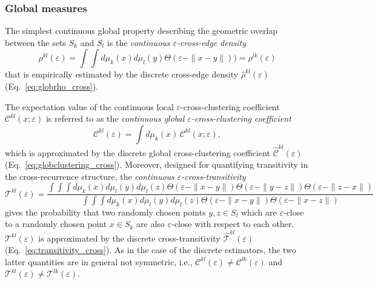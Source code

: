 \documentclass[graybox]{svmult}
\begin{document}
\subsubsection{Global measures}

The simplest continuous global property describing the geometric overlap between the sets $S_k$ and $S_l$ is the \textit{continuous $\varepsilon$-cross-edge density}
\begin{equation}
\rho^{kl}(\varepsilon) = \int\!\!\!\int d\mu_k(x) d\mu_l(y) \Theta(\varepsilon - \|x - y\|)) = \rho^{lk}(\varepsilon)
\end{equation}
that is empirically estimated by the discrete cross-edge density $\hat{\rho}^{kl}(\varepsilon)$ (Eq.~\ref{eq:globrho_cross}).

The expectation value of the continuous local $\varepsilon$-cross-clustering coefficient $\mathcal{C}^{kl}(x;\varepsilon)$ is referred to as the \textit{continuous global $\varepsilon$-cross-clustering coefficient}
\begin{equation}
\mathcal{C}^{kl}(\varepsilon) = \int d\mu_k(x)\, \mathcal{C}^{kl}(x;\varepsilon),
\end{equation}
which is approximated by the discrete global cross-clustering coefficient $\hat{\mathcal{C}}^{kl}(\varepsilon)$ (Eq.~\ref{eq:globclustering_cross}). Moreover, designed for quantifying transitivity in the cross-recurrence struc\-ture, the \textit{continuous $\varepsilon$-cross-transitivity} 
\begin{equation}
\mathcal{T}^{kl}(\varepsilon) = \frac{\int\!\!\!\int\!\!\!\int d\mu_k(x) d\mu_l(y) d\mu_l(z) \Theta(\varepsilon-\|x - y\|) \Theta(\varepsilon-\|y - z\|) \Theta(\varepsilon-\|z - x\|)}{\int\!\!\!\int\!\!\!\int d\mu_k(x) d\mu_l(y) d\mu_l(z) \Theta(\varepsilon-\|x - y\|) \Theta(\varepsilon-\|x - z\|)}
\end{equation}
gives the probability that two randomly chosen points $y,z\in S_l$ which are $\varepsilon$-close to a randomly chosen point $x\in S_k$ are also $\varepsilon$-close with respect to each other. $\mathcal{T}^{kl}(\varepsilon)$ is approximated by the discrete cross-transitivity $\hat{\mathcal{T}}^{kl}(\varepsilon)$ (Eq.~\ref{eq:transitivity_cross}). As in the case of the discrete estimators, the two latter quantities are in general not symmetric, i.e., $\mathcal{C}^{kl}(\varepsilon) \neq \mathcal{C}^{lk}(\varepsilon)$ and $\mathcal{T}^{kl}(\varepsilon) \neq \mathcal{T}^{lk}(\varepsilon)$.
\end{document}
